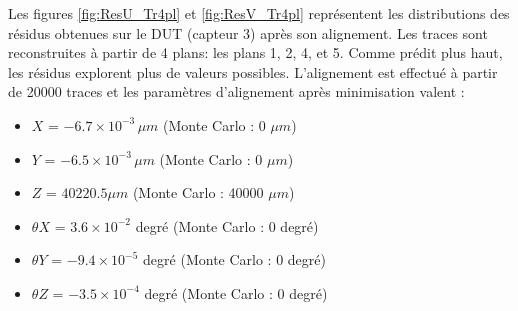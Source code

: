    \medskip  
  
  Les figures \ref{fig:ResU_Tr4pl} et \ref{fig:ResV_Tr4pl} repr\'esentent les distributions des r\'esidus obtenues sur le DUT (capteur 3) apr\`es son alignement. Les traces sont reconstruites \`a partir de 4 plans: les plans 1, 2, 4, et 5. Comme pr\'edit plus haut, les r\'esidus explorent plus de valeurs possibles. L'alignement est effectu\'e \`a partir de 20000 traces et les param\`etres d'alignement apr\`es minimisation valent :
  
   \medskip
   
   \renewcommand{\labelitemi}{$\bullet$}
  
  \begin{itemize}
   \item $X$ = $-6.7 \times 10^{-3} \, \mu m$ (Monte Carlo : 0 $\mu m$) 
   \item $Y$ = $-6.5 \times 10^{-3} \, \mu m$ (Monte Carlo : 0 $\mu m$)
   \item $Z$ = $40220.5 \mu m$ (Monte Carlo : 40000 $\mu m$)
   \item $\theta X$ = $3.6 \times 10^{-2}$ degr\'e (Monte Carlo : 0 degr\'e)
   \item $\theta Y$ = $-9.4 \times 10^{-5}$ degr\'e (Monte Carlo : 0 degr\'e)
   \item $\theta Z$ = $-3.5 \times 10^{-4}$ degr\'e (Monte Carlo : 0 degr\'e)
  \end{itemize}

   \medskip

